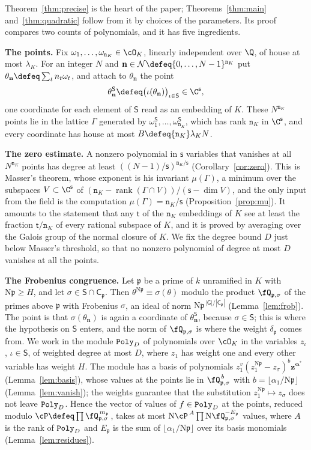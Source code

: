 \documentclass[11pt, reqno, twoside, letterpaper]{amsart}
\newcommand{\vn}{\mathbf{n}}
\newcommand{\va}{\boldsymbol{\alpha}}
\newcommand{\vz}{\mathbf{z}}
\DeclareMathOperator{\rk}{rank}
\newcommand{\Nm}{\mathrm{N}}
\newcommand{\fp}{\mathfrak{p}}
\newcommand{\dK}{{\mathtt{n}_K}}
\newcommand{\wgt}{H}
\newcommand{\bxs}{N}
\newcommand{\dgb}{D}
\newcommand{\hB}{B}
\newcommand{\lamK}{\lambda_{\Kf}}
\newcommand{\galKk}{\mathsf{G}}
\newcommand{\Kf}{K}
\newcommand{\lat}{\Gamma}
\newcommand{\PolyD}{{\tt Poly}_\dgb}
\newcommand{\rr}{A}
\newcommand{\Ew}{E}
\newcommand{\modl}{\cP}
\newcommand{\wt}{\delta}
\newcommand{\Sset}{\mathsf{S}}
\newcommand{\emb}{\iota}
\newcommand{\nS}{\mathsf{s}}
\newcommand{\nT}{\mathsf{t}}
\newcommand{\cls}{\mathsf{C}}
\newcommand{\cube}{\mathcal{N}}
\begin{document}
Theorem~\ref{thm:precise} is the heart of the paper;
Theorems~\ref{thm:main} and~\ref{thm:quadratic} follow from it by
choices of the parameters. Its proof compares two counts of
polynomials, and it has five ingredients.

\medskip\noindent\textbf{The points.}
Fix $\omega_1,\dots,\omega_\dK\in\cO_\Kf$, linearly independent over
$\Q$, of house at most $\lamK$. For an integer $\bxs$ and
$\vn\in\cube\defeq\{0,\dots,\bxs-1\}^{\dK}$ put
$\theta_\vn\defeq\sum_t n_t\omega_t$, and attach to $\theta_\vn$ the
point
\[
\theta_\vn^{\Sset}\defeq\big(\emb(\theta_\vn)\big)_{\emb\in\Sset}
\in\C^{\nS},
\]
one coordinate for each element of $\Sset$ read as an embedding of
$\Kf$. These $\bxs^{\dK}$ points lie in the lattice $\lat$ generated
by $\omega_1^{\Sset},\dots,\omega_\dK^{\Sset}$, which has rank $\dK$
in $\C^{\nS}$, and every coordinate has house at most
$\hB\defeq\dK\lamK\bxs$.

\medskip\noindent\textbf{The zero estimate.}
A nonzero polynomial in $\nS$ variables that vanishes at all
$\bxs^{\dK}$ points has degree at least $((\bxs-1)/\nS)^{\dK/\nS}$
(Corollary~\ref{cor:zero}). This is Masser's theorem, whose exponent
is his invariant $\mu(\lat)$, a minimum over the subspaces
$V\subset\C^{\nS}$ of $(\dK-\rk(\lat\cap V))/(\nS-\dim V)$, and the
only input from the field is the computation $\mu(\lat)=\dK/\nS$
(Proposition~\ref{prop:mu}). It amounts to the statement that any
$\nT$ of the $\dK$ embeddings of $\Kf$ see at least the fraction
$\nT/\dK$ of every rational subspace of $\Kf$, and it is proved by
averaging over the Galois group of the normal closure of $\Kf$. We
fix the degree bound $\dgb$ just below Masser's threshold, so that no
nonzero polynomial of degree at most $\dgb$ vanishes at all the
points.

\medskip\noindent\textbf{The Frobenius congruence.}
Let $\fp$ be a prime of $k$ unramified in $\Kf$ with $\Nm\fp\ge\wgt$,
and let $\sigma\in\Sset\cap\cls_\fp$. Then
$\theta^{\Nm\fp}\equiv\sigma(\theta)$ modulo the product
$\fQ_{\fp,\sigma}$ of the primes above $\fp$ with Frobenius $\sigma$,
an ideal of norm $\Nm\fp^{\,|\galKk|/|\cls_\fp|}$
(Lemma~\ref{lem:frob}). The point is that $\sigma(\theta_\vn)$ is
again a coordinate of $\theta_\vn^{\Sset}$, because $\sigma\in\Sset$;
this is where the hypothesis on $\Sset$ enters, and the norm of
$\fQ_{\fp,\sigma}$ is where the weight $\wt_\fp$ comes from. We work
in the module $\PolyD$ of polynomials over $\cO_\Kf$ in the variables
$z_\emb$, $\emb\in\Sset$, of weighted degree at most $\dgb$, where
$z_1$ has weight one and every other variable has weight $\wgt$. The
module has a basis of polynomials
$z_1^{v}(z_1^{\Nm\fp}-z_\sigma)^{b}\vz^{\va^*}$
(Lemma~\ref{lem:basis}), whose values at the points lie in
$\fQ_{\fp,\sigma}^{\,b}$ with $b=\lfloor\alpha_1/\Nm\fp\rfloor$
(Lemma~\ref{lem:vanish}); the weights guarantee that the
substitution $z_1^{\Nm\fp}\mapsto z_\sigma$ does not leave $\PolyD$.
Hence the vector of values of $f\in\PolyD$ at the points, reduced
modulo $\modl\defeq\prod\fQ_{\fp,\sigma}^{\,m_\fp}$, takes at most
$\Nm\modl^{\,\rr}\prod\Nm\fQ_{\fp,\sigma}^{-\Ew_\fp}$ values, where
$\rr$ is the rank of $\PolyD$ and $\Ew_\fp$ is the sum of
$\lfloor\alpha_1/\Nm\fp\rfloor$ over its basis monomials
(Lemma~\ref{lem:residues}).
\end{document}
